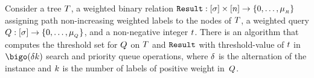 \begin{theorem}\label{th:threshold-subset-path}
  Consider 
  a tree $T$, 
  a weighted binary relation
  $\hbox{\tt Result}:[\sigma]\times[n]\rightarrow\{0,\ldots,\mu_{_{R}}\}$
  assigning path non-increasing weighted labels to the nodes of
  $T$,
  a weighted query
  $Q:[\sigma]\rightarrow\{0,\ldots,\mu_{_{Q}}\}$, 
  and a non-negative integer $t$.
  There is an algorithm that computes the threshold set for $Q$ on
  $T$ and $\hbox{\tt Result}$ with threshold-value of $t$ in
  $\bigo(\difficulty\nbkeywords)$ search and priority queue operations, where
  $\delta$ is the alternation of the instance and
  $k$ is the number of labels of positive weight in~$Q$.
\end{theorem}

